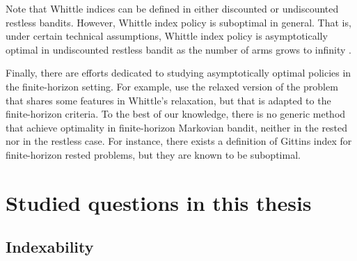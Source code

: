Note that Whittle indices can be defined in either discounted or undiscounted restless bandits.
However, Whittle index policy is suboptimal in general.
That is, under certain technical assumptions, Whittle index policy is asymptotically optimal in undiscounted restless bandit as the number of arms grows to infinity \cite{weber1990index}.

Finally, there are efforts dedicated to studying asymptotically optimal policies in the finite-horizon setting.
For example, \cite{hu2017asymptotically,brown2020index,zhang2021restless,gastGaujalYan-lpbased} use the relaxed version of the problem that shares some features in Whittle's relaxation, but that is adapted to the finite-horizon criteria.
To the best of our knowledge, there is no generic method that achieve optimality in finite-horizon Markovian bandit, neither in the rested nor in the restless case.
For instance, there exists a definition of Gittins index for finite-horizon rested problems, but they are known to be suboptimal. 



\section{Studied questions in this thesis}
\label{ch:mb:sec:studied}

\subsection{Indexability}

